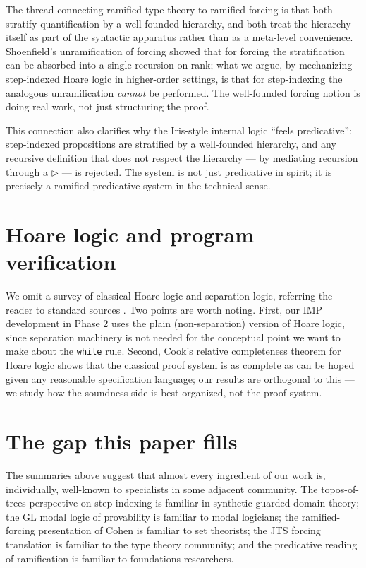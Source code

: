 \documentclass[11pt]{article}
\begin{document}
The thread connecting ramified type theory to ramified forcing is
that both stratify quantification by a well-founded hierarchy, and
both treat the hierarchy itself as part of the syntactic apparatus
rather than as a meta-level convenience. Shoenfield's
unramification of forcing showed that for forcing the stratification
can be absorbed into a single recursion on rank; what we argue, by
mechanizing step-indexed Hoare logic in higher-order settings, is
that for step-indexing the analogous unramification \emph{cannot}
be performed. The well-founded forcing notion is doing real work,
not just structuring the proof.

This connection also clarifies why the Iris-style internal logic
``feels predicative'': step-indexed propositions are stratified by a
well-founded hierarchy, and any recursive definition that does not
respect the hierarchy --- by mediating recursion through a
$\triangleright$ --- is rejected. The system is not just predicative in
spirit; it is precisely a ramified predicative system in the technical
sense.

\section{Hoare logic and program verification}

We omit a survey of classical Hoare logic and separation logic,
referring the reader to standard sources
\cite{hoare1969,ohearn-reynolds-yang-2001,brookes2007}. Two points
are worth noting. First, our IMP development in Phase 2 uses the
plain (non-separation) version of Hoare logic, since separation
machinery is not needed for the conceptual point we want to make
about the \texttt{while} rule. Second, Cook's relative completeness
theorem \cite{cook1978} for Hoare logic shows that the classical
proof system is as complete as can be hoped given any reasonable
specification language; our results are orthogonal to this --- we
study how the soundness side is best organized, not the proof system.

\section{The gap this paper fills}

The summaries above suggest that almost every ingredient of our work
is, individually, well-known to specialists in some adjacent
community. The topos-of-trees perspective on step-indexing is
familiar in synthetic guarded domain theory; the \textsf{GL} modal
logic of provability is familiar to modal logicians; the
ramified-forcing presentation of Cohen is familiar to set theorists;
the JTS forcing translation is familiar to the type theory
community; and the predicative reading of ramification is familiar
to foundations researchers.
\end{document}
